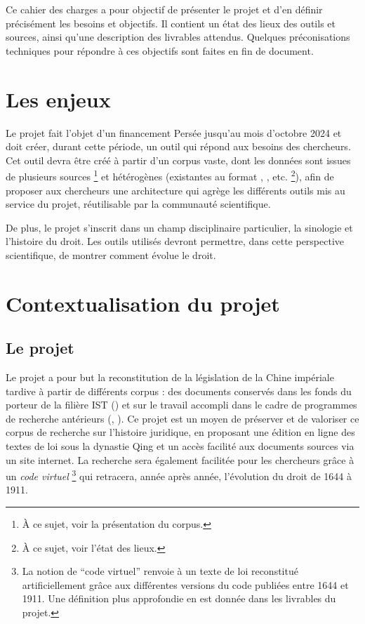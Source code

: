 Ce cahier des charges a pour objectif de présenter le projet \COREL et d’en définir précisément les besoins et objectifs. Il contient un état des lieux des outils et sources, ainsi qu’une description des livrables attendus. Quelques préconisations techniques pour répondre à ces objectifs sont faites en fin de document.

\section*{Les enjeux}
Le projet \COREL fait l’objet d’un financement \CollEx Persée jusqu’au mois d’octobre 2024 et doit créer, durant cette période, un outil qui répond aux besoins des chercheurs. Cet outil devra être créé à partir d’un corpus vaste, dont les données sont issues de plusieurs sources \footnote{À ce sujet, voir la présentation du corpus.} et hétérogènes (existantes au format \XML, \csv, etc. \footnote{À ce sujet, voir l’état des lieux.}), afin de proposer aux chercheurs une architecture qui agrège les différents outils mis au service du projet, réutilisable par la communauté scientifique. 

De plus, le projet s’inscrit dans un champ disciplinaire particulier, la sinologie et l’histoire du droit. Les outils utilisés devront permettre, dans cette perspective scientifique, de montrer comment évolue le droit. 
\newpage
\section*{Contextualisation du projet}
\subsection*{Le projet \COREL}
Le projet \href{https://www-test-collex.inist.fr/projet/corel/}{\COREL} a pour but la reconstitution de la législation de la Chine impériale tardive à partir de différents corpus : des documents conservés dans les fonds du porteur de la filière IST (\cdf) et sur le travail accompli dans le cadre de programmes de recherche antérieurs (\LSC, \EPJ). Ce projet est un moyen de préserver et de valoriser ce corpus de recherche sur l’histoire juridique, en proposant une édition en ligne des textes de loi sous la dynastie Qing et un accès facilité aux documents sources via un site internet. La recherche sera également facilitée pour les chercheurs grâce à un \textit{code virtuel} \footnote{La notion de “code virtuel” renvoie à un texte de loi reconstitué artificiellement grâce aux différentes versions du code publiées entre 1644 et 1911. Une définition plus approfondie en est donnée dans les livrables du projet. } qui retracera, année après année, l’évolution du droit de 1644 à 1911. 

